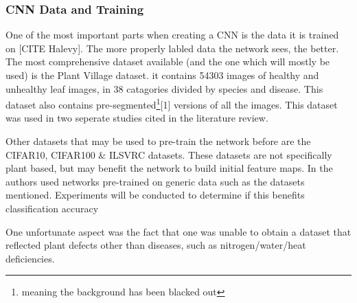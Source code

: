     \subsubsection{CNN Data and Training}
      One of the most important parts when creating a CNN is the data it is trained on [CITE Halevy]. The more properly labled data the network sees, the better. The most comprehensive dataset available (and the one which will mostly be used) is the Plant Village dataset. it contains 54303 images of healthy and unhealthy leaf images, in 38 catagories divided by species and disease. This dataset also contains pre-segmented\footnote{meaning the background has been blacked out}[1] versions of all the images. This dataset was used in two seperate studies cited in the literature review.
      \par
      Other datasets that may be used to pre-train the network before are the CIFAR10, CIFAR100 \& ILSVRC datasets. These datasets are not specifically plant based, but may benefit the network to build initial feature maps. In \cite{Choi} the authors used networks pre-trained on generic data such as the datasets mentioned. Experiments will be conducted to determine if this benefits classification accuracy
      \par
      One unfortunate aspect was the fact that one was unable to obtain a dataset that reflected plant defects other than diseases, such as nitrogen/water/heat deficiencies.


